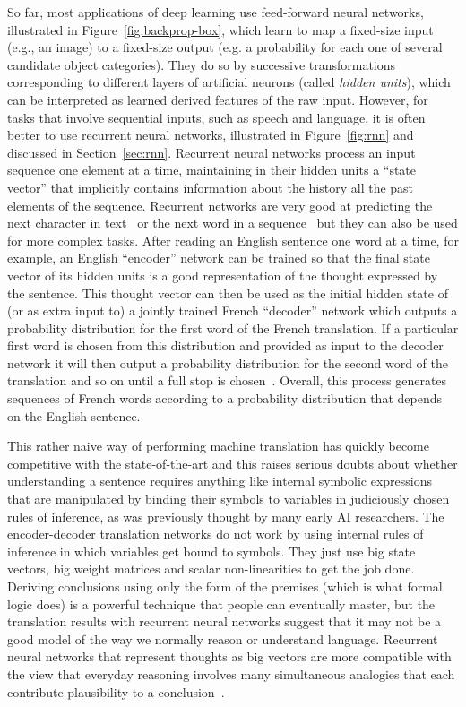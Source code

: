 \documentclass[10pts]{article}
\begin{document}
So far, most applications of deep learning use feed-forward neural
networks, illustrated in Figure~\ref{fig:backprop-box}, which learn
to map a fixed-size input (e.g., an image) to a fixed-size output
(e.g. a probability for each one of several candidate object categories). 
They do so by successive transformations corresponding to different
layers of artificial neurons (called {\em hidden units}),
which can be interpreted as learned derived features of the raw input. However, 
for tasks that involve sequential inputs, such as speech
and language, it is often better to use recurrent neural
networks, illustrated in Figure~\ref{fig:rnn} and discussed in Section~\ref{sec:rnn}. 
Recurrent neural networks process an input sequence one element at a time,
maintaining in their hidden units a ``state vector'' that implicitly contains information
about the history all the past elements of the sequence.
Recurrent networks are very good at predicting the next
character in text~\citep{Sutskever-et-al-ICML2011} or the next
word in a sequence~\citep{Mikolov-et-al-NIPS2013} but they can also be
used for more complex tasks.  After reading an English sentence one
word at a time, for example, an English ``encoder'' network can be
trained so that the final state vector of its hidden units is a good
representation of the thought expressed by the sentence.  This thought
vector can then be used as the initial hidden state of (or as extra
input to)  a jointly trained French ``decoder'' network which outputs a
probability distribution for the first word of the French
translation. If a particular first word is chosen 
from this distribution and provided as input to the decoder network it will
then output a probability distribution for the second word of the
translation and so on until a full stop is
chosen~\citep{Bahdanau-et-al-arxiv2014,Sutskever-et-al-NIPS2014}.
Overall, this process generates sequences of French words according to
a probability distribution that depends on the English sentence.

This rather naive way of performing machine translation has quickly become
competitive with the state-of-the-art and this raises serious doubts about
whether understanding a sentence requires anything like internal symbolic
expressions that are manipulated by binding their symbols to variables
in judiciously chosen rules of inference, as was previously thought by
many early AI researchers.  The encoder-decoder translation
networks do not work by using internal rules of inference in which
variables get bound to symbols. They just use big state vectors, big weight
matrices and scalar non-linearities to get the job done.  
Deriving conclusions using only the form of the premises (which is
what formal logic does) is a powerful
technique that people can eventually master, but the translation
results with recurrent neural networks suggest that it may not be a good model of
the way we normally reason or understand language. Recurrent neural
networks that represent thoughts as big vectors are more compatible with
the view that everyday reasoning involves many simultaneous analogies that
each contribute plausibility to a conclusion~\citep{metaphors,Rogers+McClelland-book2004}.
\end{document}
